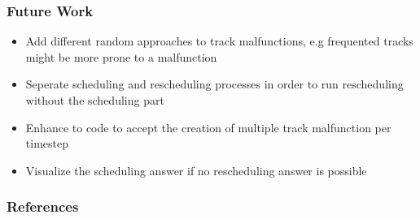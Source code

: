 \documentclass{beamer}
\begin{document}

\begin{frame}
	\frametitle{Future Work}
	\begin{itemize}
		\item Add different random approaches to track malfunctions, e.g frequented tracks might be more prone to a malfunction
		\item Seperate scheduling and rescheduling processes in order to run rescheduling without the scheduling part
		\item Enhance to code to accept the creation of multiple track malfunction per timestep
		\item Visualize the scheduling answer if no rescheduling answer is possible
	\end{itemize}
	
\end{frame}


\begin{frame}
	\frametitle{References}
	
	
\end{frame}
\end{document}
